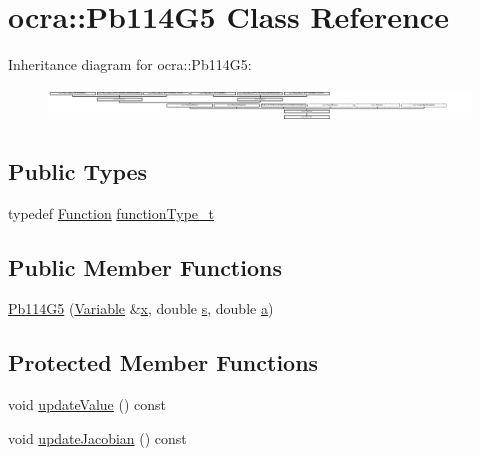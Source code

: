 \hypertarget{classocra_1_1Pb114G5}{}\section{ocra\+:\+:Pb114\+G5 Class Reference}
\label{classocra_1_1Pb114G5}
Inheritance diagram for ocra\+:\+:Pb114\+G5\+:\begin{figure}[H]
\begin{center}
\leavevmode
\includegraphics[height=0.901771cm]{d9/df1/classocra_1_1Pb114G5}
\end{center}
\end{figure}
\subsection*{Public Types}
\begin{DoxyCompactItemize}
\item 
typedef \hyperlink{classocra_1_1Function}{Function} \hyperlink{classocra_1_1Pb114G5_af9b5d124dfe6eefc49fe0603b948330e}{function\+Type\+\_\+t}
\end{DoxyCompactItemize}
\subsection*{Public Member Functions}
\begin{DoxyCompactItemize}
\item 
\hyperlink{classocra_1_1Pb114G5_a53ef7eb76deed9c8ca148f175f9bb8a6}{Pb114\+G5} (\hyperlink{classocra_1_1Variable}{Variable} \&\hyperlink{classocra_1_1Function_a28825886d1f149c87b112ec2ec1dd486}{x}, double \hyperlink{classocra_1_1Pb114G5_a97daa687d5cec8995656fa8787f8a89e}{s}, double \hyperlink{classocra_1_1Pb114G5_a36c7950fd1d7556715ae7e0749e88211}{a})
\end{DoxyCompactItemize}
\subsection*{Protected Member Functions}
\begin{DoxyCompactItemize}
\item 
void \hyperlink{classocra_1_1Pb114G5_a2a19291b7ef222254a018c0e25df8f57}{update\+Value} () const
\item 
void \hyperlink{classocra_1_1Pb114G5_a8dc90051ef52688c0879a3d129d5bf84}{update\+Jacobian} () const
\end{DoxyCompactItemize}
